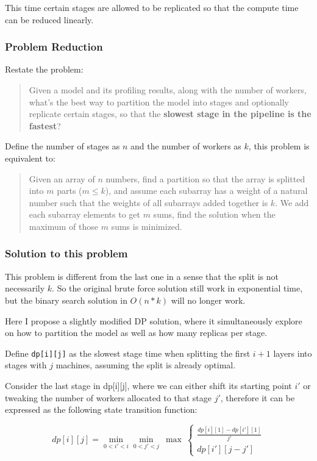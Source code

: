 \documentclass[12pt,letterpaper]{article}
\begin{document}
This time certain stages are allowed to be replicated so that the compute time can be reduced linearly. 

\subsubsection{Problem Reduction}
Restate the problem:
\begin{quote}
	Given a model and its profiling results, along with the number of workers, what's the best way to partition the model into stages and optionally replicate certain stages, so that the \textbf{slowest stage in the pipeline is the fastest}?
\end{quote}

Define the number of stages as $n$ and the number of workers as $k$, this problem is equivalent to:
\begin{quote}
	Given an array of $n$ numbers, find a partition so that the array is splitted into $m$ parts ($m \le k$), and assume each subarray has a weight of a natural number such that the weights of all subarrays added together is $k$. We add each subarray elements to get $m$ sums, find the solution when the maximum of those $m$ sums is minimized.
\end{quote}

\subsubsection{Solution to this problem}
This problem is different from the last one in a sense that the split is not necessarily $k$. So the original brute force solution still work in exponential time, but the binary search solution in $O(n*k)$ will no longer work.

Here I propose a slightly modified DP solution, where it simultaneously explore on how to partition the model as well as how many replicas per stage.

Define \texttt{dp[i][j]} as the slowest stage time when splitting the first $i+1$ layers into stages with $j$ machines, assuming the split is already optimal.

Consider the last stage in dp[i][j], where we can either shift its starting point $i'$ or tweaking the number of workers allocated to that stage $j'$, therefore it can be expressed as the following state transition function:

$$dp[i][j] = \min_{0<i'<i}\min_{0<j'<j}\ \max\ \left\{\begin{array}{lr}
        	\frac{dp[i][1] - dp[i'][1]}{j'} \\
        	dp[i'][j-j']
        \end{array} \right .$$
        
\end{document}
